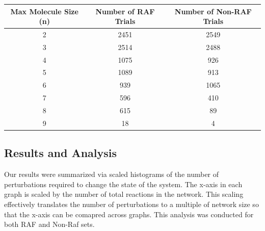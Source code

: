 \documentclass[11pt]{article}
\begin{document}
\begin{table}[h!]
    \centering
     \begin{tabular}{||c| c| c||} 
     \hline
     Max Molecule Size (n) & Number of RAF Trials & Number of Non-RAF Trials \\ [0.5ex] 
     \hline\hline
     2 & 2451 & 2549 \\ 
     3 & 2514 & 2488 \\
     4 & 1075 & 926 \\
     5 & 1089 & 913 \\
     6 & 939 & 1065 \\
     7 & 596 & 410 \\ 
     8 & 615 & 89 \\ 
     9 & 18 & 4 \\ 
     \hline
    \end{tabular}
\end{table}



\subsection{Results and Analysis}

Our results were summarized via scaled histograms of the number of perturbations required to change the state of the system.
The x-axis in each graph is scaled by the number of total reactions in the network. 
This scaling effectively translates the number of perturbations to a multiple of network size so that the x-axis can be comapred across graphs. 
This analysis was conducted for both RAF and Non-Raf sets. 
\end{document}
